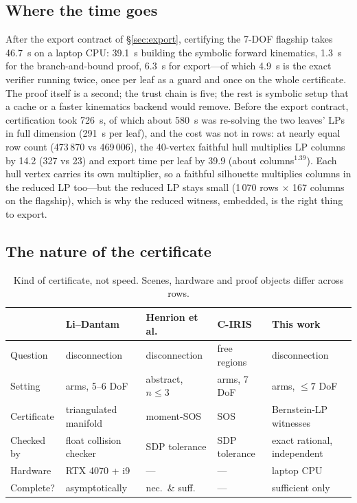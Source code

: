\documentclass[10pt,twocolumn,letterpaper]{article}
\begin{document}
\subsection{Where the time goes}
After the export contract of \S\ref{sec:export}, certifying the 7-DOF flagship takes 46.7~s on a laptop CPU: 39.1~s building the symbolic forward kinematics, 1.3~s for the branch-and-bound proof, 6.3~s for export---of which 4.9~s is the exact verifier running twice, once per leaf as a guard and once on the whole certificate. The proof itself is a second; the trust chain is five; the rest is symbolic setup that a cache or a faster kinematics backend would remove. Before the export contract, certification took 726~s, of which about 580~s was re-solving the two leaves' LPs in full dimension (291~s per leaf), and the cost was not in rows: at nearly equal row count (473\,870 vs 469\,006), the 40-vertex faithful hull multiplies LP columns by 14.2 (327 vs 23) and export time per leaf by 39.9 (about columns$^{1.39}$). Each hull vertex carries its own multiplier, so a faithful silhouette multiplies columns in the reduced LP too---but the reduced LP stays small (1\,070 rows $\times$ 167 columns on the flagship), which is why the reduced witness, embedded, is the right thing to export.

\subsection{The nature of the certificate}

\begin{table}[t]
\centering\small
\caption{Kind of certificate, not speed. Scenes, hardware and proof objects differ across rows.}
\label{tab:nature}
\begin{tabular}{@{}lllll@{}}
\toprule
 & Li--Dantam~\cite{li2024gpu} & Henrion et al.~\cite{henrion2024} & C-IRIS~\cite{dai2024ciris} & This work \\
\midrule
Question & disconnection & disconnection & free regions & disconnection \\
Setting & arms, 5--6 DoF & abstract, $n\le3$ & arms, 7 DoF & arms, $\le7$ DoF \\
Certificate & triangulated manifold & moment-SOS & SOS & Bernstein-LP witnesses \\
Checked by & float collision checker & SDP tolerance & SDP tolerance & exact rational, independent \\
Hardware & RTX 4070 + i9 & --- & --- & laptop CPU \\
Complete? & asymptotically & nec.\ \& suff. & --- & sufficient only \\
\bottomrule
\end{tabular}
\end{table}
\end{document}
